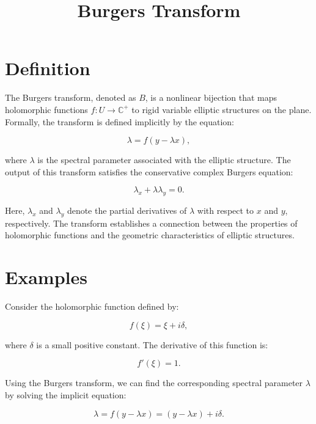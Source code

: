 \documentclass[11pt,a4paper]{article}
\title{Burgers Transform}
\date{}
\begin{document}
\maketitle
\section{Definition}
The Burgers transform, denoted as \( B \), is a nonlinear bijection that maps holomorphic functions \( f: U \to \mathbb{C}^+ \) to rigid variable elliptic structures on the plane. Formally, the transform is defined implicitly by the equation:

\begin{equation}
\lambda = f(y - \lambda x),
\end{equation}

where \( \lambda \) is the spectral parameter associated with the elliptic structure. The output of this transform satisfies the conservative complex Burgers equation:

\begin{equation}
\lambda_x + \lambda \lambda_y = 0.
\end{equation}

Here, \( \lambda_x \) and \( \lambda_y \) denote the partial derivatives of \( \lambda \) with respect to \( x \) and \( y \), respectively. The transform establishes a connection between the properties of holomorphic functions and the geometric characteristics of elliptic structures.

\section{Examples}
Consider the holomorphic function defined by:

\begin{equation}
f(\xi) = \xi + i\delta,
\end{equation}

where \( \delta \) is a small positive constant. The derivative of this function is:

\begin{equation}
f'(\xi) = 1.
\end{equation}

Using the Burgers transform, we can find the corresponding spectral parameter \( \lambda \) by solving the implicit equation:

\begin{equation}
\lambda = f(y - \lambda x) = (y - \lambda x) + i\delta.
\end{equation}
\end{document}
